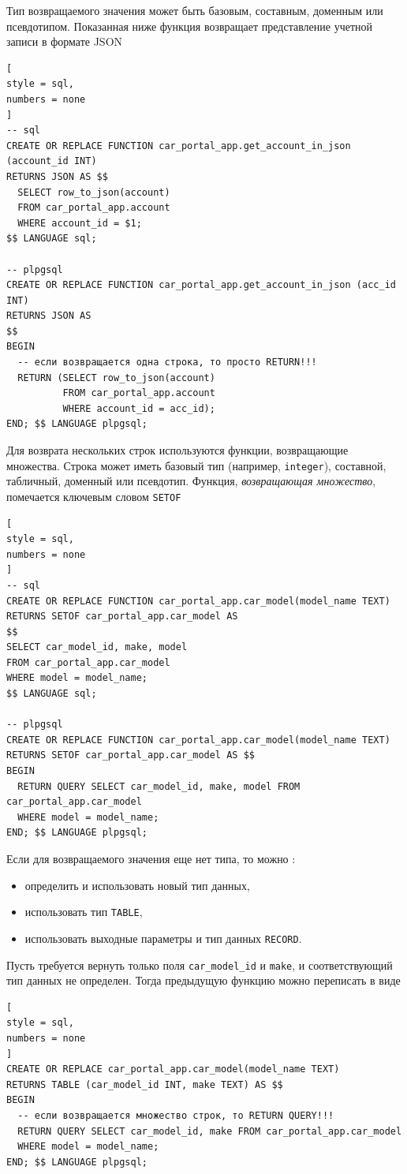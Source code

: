\documentclass[%
	11pt,
	a4paper,
	utf8,
		]{article}
\begin{document}
Тип возвращаемого значения может быть базовым, составным, доменным или псевдотипом. Показанная ниже функция возвращает представление учетной записи в формате JSON
\begin{lstlisting}[
style = sql,
numbers = none
] 
-- sql
CREATE OR REPLACE FUNCTION car_portal_app.get_account_in_json (account_id INT)
RETURNS JSON AS $$
  SELECT row_to_json(account)
  FROM car_portal_app.account
  WHERE account_id = $1;
$$ LANGUAGE sql;

-- plpgsql
CREATE OR REPLACE FUNCTION car_portal_app.get_account_in_json (acc_id INT)
RETURNS JSON AS 
$$
BEGIN
  -- если возвращается одна строка, то просто RETURN!!!
  RETURN (SELECT row_to_json(account)
          FROM car_portal_app.account
          WHERE account_id = acc_id);
END; $$ LANGUAGE plpgsql;
\end{lstlisting}

Для возврата нескольких строк используются функции, возвращающие множества. Строка может иметь базовый тип (например, \texttt{integer}), составной, табличный, доменный или псевдотип. Функция, \emph{возвращающая множество}, помечается ключевым словом \texttt{SETOF}
\begin{lstlisting}[
style = sql,
numbers = none
]
-- sql
CREATE OR REPLACE FUNCTION car_portal_app.car_model(model_name TEXT)
RETURNS SETOF car_portal_app.car_model AS
$$
SELECT car_model_id, make, model
FROM car_portal_app.car_model
WHERE model = model_name;
$$ LANGUAGE sql;

-- plpgsql
CREATE OR REPLACE FUNCTION car_portal_app.car_model(model_name TEXT)
RETURNS SETOF car_portal_app.car_model AS $$
BEGIN
  RETURN QUERY SELECT car_model_id, make, model FROM car_portal_app.car_model
  WHERE model = model_name;
END; $$ LANGUAGE plpgsql;
\end{lstlisting}

Если для возвращаемого значения еще нет типа, то можно \cite[]{juba:2019}:
\begin{itemize}
	\item определить и использовать новый тип данных,
	
	\item использовать тип \texttt{TABLE},
	
	\item использовать выходные параметры и тип данных \texttt{RECORD}.
\end{itemize}

Пусть требуется вернуть только поля \texttt{car\_model\_id} и \texttt{make}, и соответствующий тип данных не определен. Тогда предыдущую функцию можно переписать в виде
\begin{lstlisting}[
style = sql,
numbers = none
] 
CREATE OR REPLACE car_portal_app.car_model(model_name TEXT)
RETURNS TABLE (car_model_id INT, make TEXT) AS $$
BEGIN
  -- если возвращается множество строк, то RETURN QUERY!!!
  RETURN QUERY SELECT car_model_id, make FROM car_portal_app.car_model
  WHERE model = model_name;
END; $$ LANGUAGE plpgsql;
\end{lstlisting}
\end{document}
